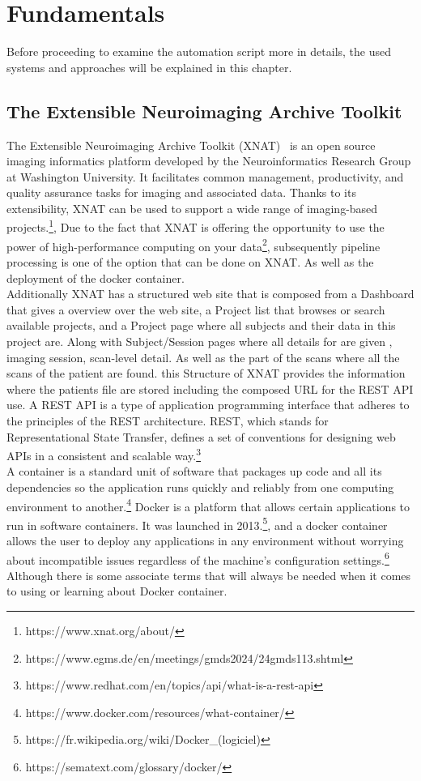\chapter{Fundamentals}

Before proceeding to examine the automation script more in details, the used systems and approaches will be explained in this chapter.

\section{The Extensible Neuroimaging Archive Toolkit}
The Extensible Neuroimaging Archive Toolkit (XNAT)~\cite{marcus_extensible_2007} is an open source imaging informatics platform developed by the Neuroinformatics Research Group at Washington University. It facilitates common management, productivity, and quality assurance tasks for imaging and associated data. Thanks to its extensibility, XNAT can be used to support a wide range of imaging-based projects.\footnote{https://www.xnat.org/about/}, Due to the fact that XNAT is offering the opportunity to use the power of high-performance computing on your   data\footnote{https://www.egms.de/en/meetings/gmds2024/24gmds113.shtml}, 
subsequently  pipeline processing is one of the option that can be done on XNAT. As well as the deployment of the docker container.
\\
Additionally XNAT has a structured web site that is composed from a Dashboard that gives a overview over the web site, a Project list that browses or search available projects, and a Project page where all subjects and their data in this project are. Along with Subject/Session pages where all details for are given , imaging session, scan-level detail.
As well as the part of the scans where all the scans of the patient are found. 
this Structure of XNAT provides the information where the patients file are stored including the composed URL for the REST API use. A REST API is a type of application programming interface that adheres to the principles of the REST architecture. REST, which stands for Representational State Transfer, defines a set of conventions for designing web APIs in a consistent and scalable way.\footnote{https://www.redhat.com/en/topics/api/what-is-a-rest-api}
\\
A container is a standard unit of software that packages up code and all its dependencies so the application runs quickly and reliably from one computing environment to another.\footnote{https://www.docker.com/resources/what-container/}
Docker is a platform that allows certain applications to run in software containers. It was launched in 2013.\footnote{https://fr.wikipedia.org/wiki/Docker\_(logiciel)}, and a docker container allows the user to deploy any applications in any environment without worrying about incompatible issues regardless of the machine’s configuration settings.\footnote{https://sematext.com/glossary/docker/} Although there is some associate terms that will always be needed when it comes to using or learning about Docker container.
